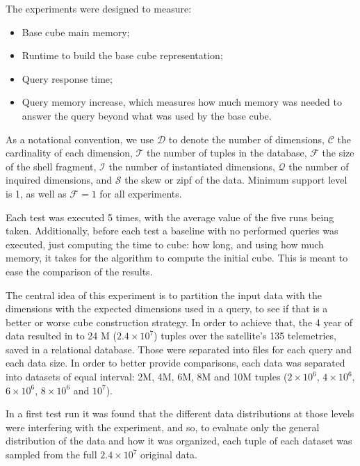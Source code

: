 The experiments were designed to measure:

\begin{itemize}[noitemsep]
\item Base cube main memory;
\item Runtime to build the base cube representation;
\item Query response time;
\item Query memory increase, which measures how much memory was needed to answer the query beyond what was used by the base cube.
\end{itemize}

As a notational convention, we use \(\mathcal{D}\) to denote the number of dimensions, \(\mathcal{C}\) the cardinality of each dimension, \(\mathcal{T}\) the number of tuples in the database, \(\mathcal{F}\) the size of the shell fragment, \(\mathcal{I}\) the number of instantiated dimensions, \(\mathcal{Q}\) the number of inquired dimensions, and \(\mathcal{S}\) the skew or zipf of the data.
Minimum support level is 1, as well as \(\mathcal{F} = 1\) for all experiments.

Each test was executed 5 times, with the average value of the five runs being taken.
Additionally, before each test a baseline with no performed queries was executed, just computing the time to cube: how long, and using how much memory, it takes for the algorithm to compute the initial cube.
This is meant to ease the comparison of the results.

The central idea of this experiment is to partition the input data with the dimensions with the expected dimensions used in a query, to see if that is a better or worse cube construction strategy.
In order to achieve that, the 4 year of data resulted in to 24 M (\(\ensuremath{2.4\times 10^{7}}\)) tuples over the satellite's 135 telemetries, saved in a relational database.
Those were separated into files for each query and each data size.
In order to better provide comparisons, each data was separated into datasets of equal interval: 2M, 4M, 6M, 8M and 10M tuples (\(\ensuremath{2\times 10^{6}}\), \(\ensuremath{4\times 10^{6}}\), \(\ensuremath{6\times 10^{6}}\), \(\ensuremath{8\times 10^{6}}\) and \(\ensuremath{10^{7}}\)).

In a first test run it was found that the different data distributions at those levels were interfering with the experiment, and so, to evaluate only the general distribution of the data and how it was organized, each tuple of each dataset was sampled from the full \(\ensuremath{2.4\times 10^{7}}\) original data.

